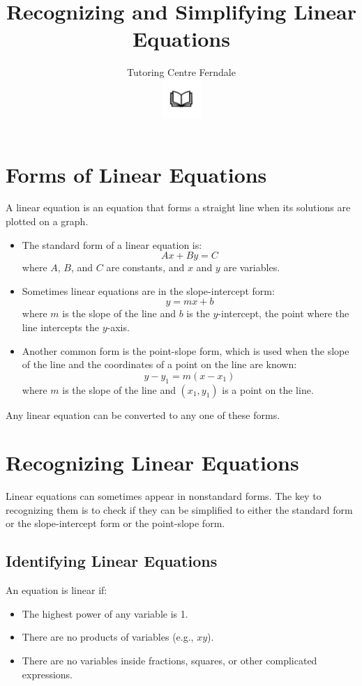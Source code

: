 \documentclass{article}
\title{Recognizing and Simplifying Linear Equations}\\
\author{Tutoring Centre Ferndale\\
\includegraphics[width=4em]{ApS_logo.png}}
\date{}
\begin{document}
\maketitle

\section*{Forms of Linear Equations}
A linear equation is an equation that forms a straight line when its solutions are plotted on a graph.

\begin{itemize}
    \item The standard form of a linear equation is:
\[
Ax + By = C
\]
where \(A\), \(B\), and \(C\) are constants, and \(x\) and \(y\) are variables.

\item Sometimes linear equations are in the slope-intercept form:
\[
y=mx+b
\]
where $m$ is the slope of the line and $b$ is the $y$-intercept, the point where the line intercepts the $y$-axis.

\item Another common form is the point-slope form, which is used when the slope of the line and the coordinates of a point on the line are known:
\[
y - y_1 = m(x - x_1)
\]
where \(m\) is the slope of the line and \((x_1, y_1)\) is a point on the line.
\end{itemize}

Any linear equation can be converted to any one of these forms.

\newpage

\section*{Recognizing Linear Equations}
Linear equations can sometimes appear in nonstandard forms. The key to recognizing them is to check if they can be simplified to either the standard form or the slope-intercept form or the point-slope form.

\subsection*{Identifying Linear Equations}
An equation is linear if:
\begin{itemize}
    \item The highest power of any variable is 1.
    \item There are no products of variables (e.g., \(xy\)).
    \item There are no variables inside fractions, squares, or other complicated expressions.
\end{itemize}
\end{document}
